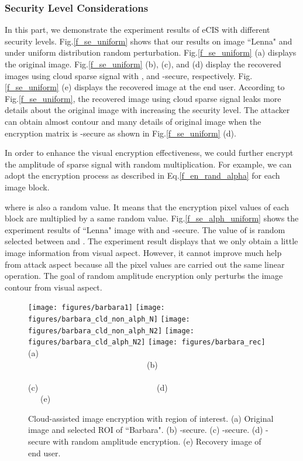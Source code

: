 \documentclass[conference]{IEEEtran}
\begin{document}
\subsubsection{Security Level Considerations}
In this part, we demonstrate  the experiment results of eCIS with different security levels. Fig.\ref{f_se_uniform} shows that
our results on  image ``Lenna" and under uniform distribution random perturbation. Fig.\ref{f_se_uniform} (a) displays the original image. Fig.\ref{f_se_uniform} (b), (c), and (d) display the recovered images using cloud sparse signal with ,  and -secure, respectively. Fig.\ref{f_se_uniform} (e) displays the recovered image at the end user. According to Fig.\ref{f_se_uniform}, the recovered  image  using cloud sparse signal leaks more details about the original image with increasing the security level. The attacker can  obtain almost contour and many details of original image when the encryption matrix is -secure as shown in  Fig.\ref{f_se_uniform} (d).

In order to enhance the visual encryption effectiveness, we could further encrypt the amplitude of sparse signal with random multiplication. For example, we can adopt the encryption process as described in  Eq.\ref{f_en_rand_alpha} for each image block.

where  is also a random value. It means that the encryption pixel values of each block are multiplied by a same random value. Fig.\ref{f_se_alph_uniform} shows the experiment results of ``Lenna" image with  and -secure. The value of  is random selected between  and . The experiment result displays that we only obtain a little image information from  visual aspect. However, it cannot improve much help from attack aspect because all the pixel values are carried out the same linear operation. The goal of random amplitude encryption only perturbs the image contour from visual aspect.
\begin{figure*}[t]
\begin{center}
  \texttt{[image: figures/barbara1]}
  \texttt{[image: figures/barbara\_cld\_non\_alph\_N]}
  \texttt{[image: figures/barbara\_cld\_non\_alph\_N2]}
  \texttt{[image: figures/barbara\_cld\_alph\_N2]}
  \texttt{[image: figures/barbara\_rec]}  \\
  {\footnotesize (a) ~~~~~~~~~~~~~~~~~~~~~~~~~~~~~(b)~~~~~~~~~~~~~~~~~~~~~~~~~~~~~ (c)~~~~~~~~~~~~~~~~~~~~~~~~~~~~~(d)~~~~~~~~~~~~~~~~~~~~~~~~~~~~~(e) }\\
  \caption{{\footnotesize Cloud-assisted image encryption with region of interest. (a) Original image and selected ROI of ``Barbara". (b) -secure. (c) -secure. (d) -secure with random amplitude encryption. (e) Recovery image of end user.}}\label{f_se_ROI}
   \end{center}
\end{figure*}
\end{document}
